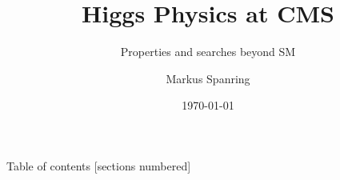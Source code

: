 \documentclass[aspectratio=1610,10pt]{beamer}
\title{Higgs Physics at CMS}
\subtitle{Properties and searches beyond SM}
\date{\today}
\author{Markus Spanring}
\institute{On behalf of the CMS collaboration}
\begin{document}
\maketitle
\begin{frame}{Table of contents}
  [sections numbered]
  \tableofcontents[hideallsubsections]
\end{frame}


\end{document}
